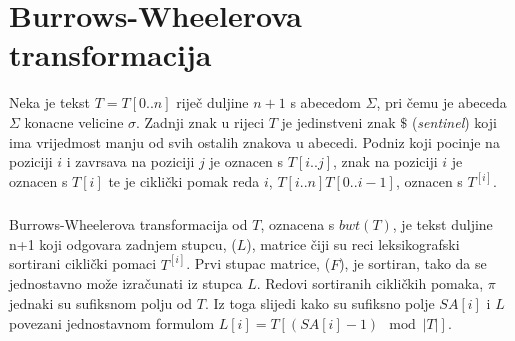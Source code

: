 \documentclass{ferseminar}
\begin{document}
\section{Burrows-Wheelerova transformacija}
Neka je tekst $T=T[0..n]$ riječ duljine $n+1$ s abecedom $\Sigma$, pri čemu je abeceda $\Sigma$ konacne velicine $\sigma$. Zadnji znak u rijeci $T$ je jedinstveni znak $\$$ (\textit{sentinel}) koji ima vrijedmost manju od svih ostalih znakova u abecedi.  Podniz koji pocinje na poziciji $i$ i zavrsava na poziciji $j$ je oznacen s $T[i..j]$, znak na poziciji $i$ je oznacen s $T[i]$ te je ciklički pomak reda $i$,  $T[i..n]T[0..i-1]$, oznacen s $T^{[i]}$.
\subparagraph{}
Burrows-Wheelerova transformacija od $T$, oznacena s $bwt(T)$, je tekst duljine n+1 koji odgovara zadnjem stupcu, ($L$), matrice čiji su reci leksikografski sortirani ciklički pomaci $T^{[i]}$. Prvi stupac matrice, ($F$), je sortiran, tako da se jednostavno može izračunati iz stupca $L$. Redovi sortiranih cikličkih pomaka, $\pi$ jednaki su sufiksnom polju od $T$. Iz toga slijedi kako su sufiksno polje $SA[i]$ i $L$ povezani jednostavnom formulom $L[i]= T[(SA[i]-1) \mod |T|]$.
\subparagraph{}
\end{document}
